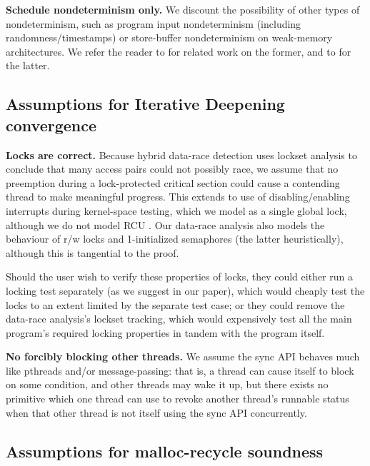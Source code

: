 {\bf Schedule nondeterminism only.}
We discount the possibility of other types of nondeterminism,
such as program input nondeterminism (including randomness/timestamps) or
store-buffer nondeterminism on weak-memory architectures.
We refer the reader to \cite{klee,portend} for related work on the former, and to \cite{tsopso} for the latter.

\subsection{Assumptions for Iterative Deepening convergence}

{\bf Locks are correct.}
Because hybrid data-race detection uses lockset analysis to conclude that many access pairs could not possibly race,
we assume that no preemption during a lock-protected critical section could cause a contending thread to make meaningful progress.
This extends to use of disabling/enabling interrupts during kernel-space testing, which we model as a single global lock,
although we do not model RCU \cite{rcu}.
Our data-race analysis also models the behaviour of r/w locks and 1-initialized semaphores (the latter heuristically), although this is tangential to the proof.

Should the user wish to verify these properties of locks,
they could either run a locking test separately (as we suggest in our paper),
which would cheaply test the locks to an extent limited by the separate test case;
or they could remove the data-race analysis's lockset tracking,
which would expensively test all the main program's required locking properties in tandem with the program itself.

{\bf No forcibly blocking other threads.}
We assume the sync API behaves much like pthreads and/or message-passing:
that is, a thread can cause itself to block on some condition,
and other threads may wake it up,
but there exists no primitive which one thread can use to revoke another thread's runnable status when that other thread is not itself using the sync API concurrently.

\subsection{Assumptions for malloc-recycle soundness}


